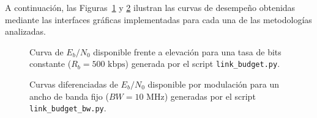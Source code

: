 A continuación, las Figuras~\ref{fig:grafico_bitrate} y \ref{fig:grafico_bw} ilustran las curvas de desempeño obtenidas mediante las interfaces gráficas implementadas para cada una de las metodologías analizadas.

\begin{figure}[H]
    \centering
    \caption{Curva de $E_b/N_0$ disponible frente a elevación para una tasa de bits constante ($R_b = 500\text{ kbps}$) generada por el script \texttt{link\_budget.py}.}
    \label{fig:grafico_bitrate}
\end{figure}

\begin{figure}[H]
    \centering
    \caption{Curvas diferenciadas de $E_b/N_0$ disponible por modulación para un ancho de banda fijo ($BW = 10\text{ MHz}$) generadas por el script \texttt{link\_budget\_bw.py}.}
    \label{fig:grafico_bw}
\end{figure}